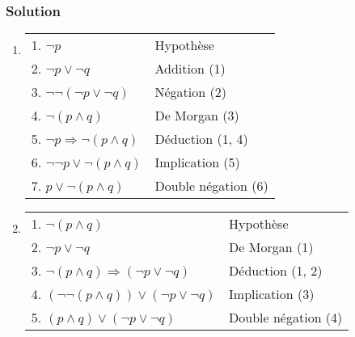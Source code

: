    \subsubsection*{Solution}
    \begin{enumerate}
    
	\item  \hspace{1em}
    \begin{center}
    \begin{tabular}{|l|l|}
    \hline
    \hspace{0.5cm} 1. $\neg p$ & Hypothèse \\
    \hspace{0.5cm} 2. $\neg p \lor \neg q$ & Addition (1) \\
    \hspace{0.5cm} 3. $\neg \neg(\neg p \lor \neg q)$ & Négation (2) \\
    \hspace{0.5cm} 4. $\neg(p \land q)$ & De Morgan (3)\\ 
    5. $\neg p \Rightarrow \neg(p \land q)$ & Déduction (1, 4) \\
    6. $\neg \neg p \lor \neg(p \land q)$ & Implication (5)\\
    7. $p \lor \neg(p \land q)$ & Double négation (6)\\
    \hline
    \end{tabular}
    \end{center}

	\item  \hspace{1em}
    \begin{center}
    \begin{tabular}{|l|l|}
    \hline
    \hspace{0.5cm} 1. $\neg (p \land q)$ & Hypothèse \\
    \hspace{0.5cm} 2. $\neg p \lor \neg q$ & De Morgan (1) \\
    3. $\neg (p \land q) \Rightarrow (\neg p \lor \neg q)$ & Déduction (1, 2) \\
    4. $(\neg \neg(p \land q)) \lor (\neg p \lor \neg q)$ & Implication (3) \\ 
    5. $(p \land q) \lor (\neg p \lor \neg q)$ & Double négation (4) \\
    \hline
    \end{tabular}
    \end{center}


\end{enumerate}
